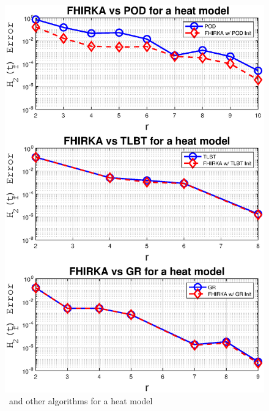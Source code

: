 \documentclass[twocolumn]{autart}
\begin{document}
 
 
 
%

 \begin{figure}%
 \centering
 \includegraphics [scale=0.5]{fig1h} 
 \caption{\FH \ and other algorithms for a heat model\label{fig:hm}}
 \end{figure}
\end{document}
